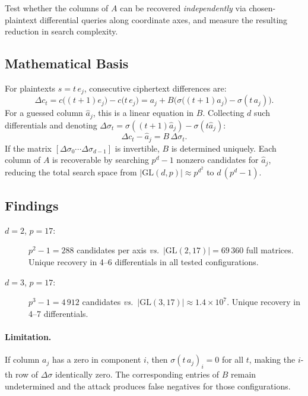 \documentclass[12pt,a4paper]{article}
\theoremstyle{definition}
\newcommand{\GL}{\mathrm{GL}}
\begin{document}
Test whether the columns of $A$ can be recovered \emph{independently}
via chosen-plaintext differential queries along coordinate axes, and
measure the resulting reduction in search complexity.

\subsection{Mathematical Basis}

For plaintexts $s = t\,e_j$, consecutive ciphertext differences are:
\begin{equation}\label{eq:diff}
  \Delta c_t = c\bigl((t+1)e_j\bigr) - c\bigl(t\,e_j\bigr)
  = a_j + B\bigl(\sigma\bigl((t+1)a_j\bigr) - \sigma(t\,a_j)\bigr).
\end{equation}
For a guessed column $\hat{a}_j$, this is a linear equation in $B$.
Collecting $d$ such differentials and denoting
$\Delta\sigma_t = \sigma((t+1)\hat{a}_j) - \sigma(t\hat{a}_j)$:
\begin{equation}
  \Delta c_t - \hat{a}_j = B\,\Delta\sigma_t.
\end{equation}
If the matrix $[\Delta\sigma_0 \cdots \Delta\sigma_{d-1}]$ is
invertible, $B$ is determined uniquely.
Each column of $A$ is recoverable by searching $p^d - 1$ nonzero
candidates for $\hat{a}_j$, reducing the total search space from
$|\GL(d,p)| \approx p^{d^2}$ to $d\,(p^d - 1)$.

\subsection{Findings}

\begin{description}
  \item[$d = 2$, $p = 17$:] $p^2 - 1 = 288$ candidates per axis
    \emph{vs.}\ $|\GL(2,17)| = 69\,360$ full matrices. Unique recovery
    in 4--6 differentials in all tested configurations.
  \item[$d = 3$, $p = 17$:] $p^3 - 1 = 4\,912$ candidates
    \emph{vs.}\ $|\GL(3,17)| \approx 1.4\times 10^7$. Unique recovery
    in 4--7 differentials.
\end{description}

\paragraph{Limitation.} If column $a_j$ has a zero in component $i$,
then $\sigma(t\,a_j)_i = 0$ for all $t$, making the $i$-th row of
$\Delta\sigma$ identically zero. The corresponding entries of $B$
remain undetermined and the attack produces false negatives for those
configurations.
\end{document}
